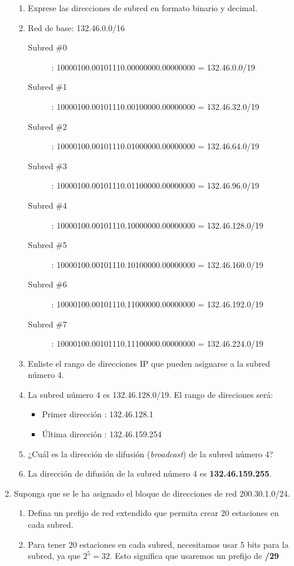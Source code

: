 \begin{enumerate}
\begin{enumerate}
        \item Exprese las direcciones de subred en formato binario y decimal.
        \item[] Red de base: 132.46.0.0/16
        \begin{description}
            \item[Subred \#0] : 10000100.00101110.00000000.00000000 = 132.46.0.0/19 
            \item[Subred \#1] : 10000100.00101110.00100000.00000000 = 132.46.32.0/19
            \item[Subred \#2] : 10000100.00101110.01000000.00000000 = 132.46.64.0/19
            \item[Subred \#3] : 10000100.00101110.01100000.00000000 = 132.46.96.0/19
            \item[Subred \#4] : 10000100.00101110.10000000.00000000 = 132.46.128.0/19
            \item[Subred \#5] : 10000100.00101110.10100000.00000000 = 132.46.160.0/19
            \item[Subred \#6] : 10000100.00101110.11000000.00000000 = 132.46.192.0/19
            \item[Subred \#7] : 10000100.00101110.11100000.00000000 = 132.46.224.0/19     
        \end{description}
\newpage
        \item Enliste el rango de direcciones IP que pueden asignarse a la subred n\'umero 4.
        \item[] La subred n\'umero 4 es 132.46.128.0/19. El rango de direciones ser\'a:
        \begin{itemize}
            \item Primer direcci\'on : 132.46.128.1
            \item \'Ultima direcci\'on : 132.46.159.254
        \end{itemize}

        \item ¿Cu\'al es la direcci\'on de difusi\'on (\textit{broadcast}) de la subred n\'umero 4?
        \item[] La direcci\'on de difusi\'on de la subred n\'umero 4 es \textbf{132.46.159.255}.
    \end{enumerate}

    \item Suponga que se le ha asignado el bloque de direcciones de red 200.30.1.0/24.
    \begin{enumerate}
        \item Defina un prefijo de red extendido que permita crear 20 estaciones en cada subred.
        \item[] Para tener 20 estaciones en cada subred, necesitamos usar 5 bits para la subred, ya que \(2^5=32\).
        Esto significa que usaremos un prefijo de \textbf{/29}


\end{enumerate}
\end{enumerate}
